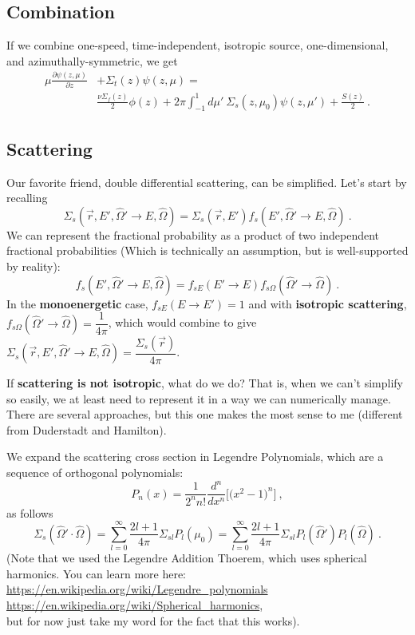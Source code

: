 \documentclass[12pt]{article}
\newcommand{\vOmega}{\ensuremath{\hat{\Omega}}}
\begin{document}
\subsection*{Combination}
If we combine one-speed, time-independent, isotropic source, one-dimensional, and azimuthally-symmetric, we get
\begin{align*}
\mu \frac{\partial \psi(z, \mu)}{\partial z} &+ \Sigma_t(z)\psi(z, \mu) = \\
&\frac{\nu\Sigma_f(z) }{2}\phi(z) + 2\pi\int_{-1}^1 d\mu'\: \Sigma_s(z, \mu_0)\psi(z, \mu')  + \frac{S(z)}{2} \:.
\end{align*}

\subsection*{Scattering}
Our favorite friend, double differential scattering, can be simplified. Let's start by recalling
\[\Sigma_s(\vec{r}, E', \vOmega' \rightarrow E, \vOmega) = \Sigma_s(\vec{r},E') f_s(E', \vOmega' \rightarrow E, \vOmega)\:.\]
We can represent the fractional probability as a product of two independent fractional probabilities (Which is technically an assumption, but is well-supported by reality):
\[f_s(E', \vOmega' \rightarrow E, \vOmega) = f_{sE}(E' \rightarrow E) f_{s\Omega}(\vOmega'  \rightarrow \vOmega)\:.\]
%
In the \textbf{monoenergetic} case, $f_{sE}(E \rightarrow E') = 1$ and with \textbf{isotropic scattering}, $f_{s\Omega}(\vOmega'  \rightarrow \vOmega) = \dfrac{1}{4\pi}$, which would combine to give $\Sigma_s(\vec{r}, E', \vOmega' \rightarrow E, \vOmega) = \dfrac{\Sigma_s(\vec{r})}{4 \pi}$.

If \textbf{scattering is not isotropic}, what do we do? That is,  when we can't simplify so easily, we at least need to represent it in a way we can numerically manage. There are several approaches, but this one makes the most sense to me (different from Duderstadt and Hamilton). 

We expand the scattering cross section in Legendre Polynomials, which are a sequence of orthogonal polynomials:
%
\[P_n(x) = \frac{1}{2^n n!}\frac{d^n}{dx^n} \bigl[\bigl( x^2 -1 \bigr)^n\bigr]\:,\]
as follows
\[\Sigma_s(\vOmega' \cdot \vOmega) = \sum_{l=0}^{\infty} \frac{2l+1}{4\pi} \Sigma_{sl} P_l(\mu_0) = \sum_{l=0}^{\infty} \frac{2l+1}{4\pi} \Sigma_{sl} P_l(\vOmega')P_l(\vOmega) \:. \]
%
(Note that we used the Legendre Addition Thoerem, which uses spherical harmonics. You can learn more here:\\\href{https://en.wikipedia.org/wiki/Legendre_polynomials}{https://en.wikipedia.org/wiki/Legendre\_polynomials}\\ \href{https://en.wikipedia.org/wiki/Spherical_harmonics}{https://en.wikipedia.org/wiki/Spherical\_harmonics},\\
but for now just take my word for the fact that this works). 
\end{document}
